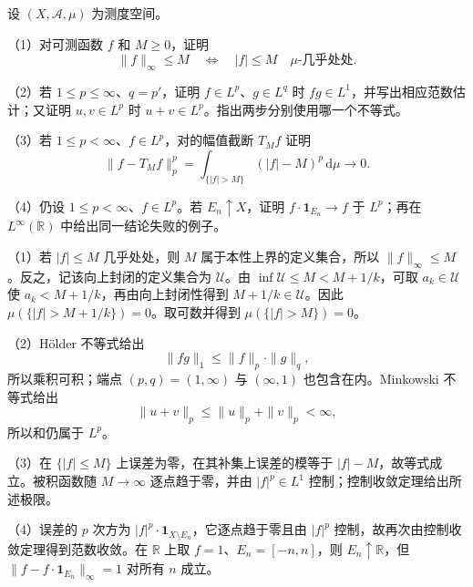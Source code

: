 \begin{exercise}[基础运算]\label{b1:ex:10-basic-norm-tools}
设 \((X,\mathcal A,\mu)\) 为测度空间。

\ProseParagraphBreak

（1）对可测函数 \(f\) 和 \(M\geq0\)，证明
\[
 \|f\|_\infty\leq M
 \quad\Longleftrightarrow\quad
 |f|\leq M\quad\mu\text{-几乎处处}.
\]

（2）若 \(1\leq p\leq\infty\)、\(q=p'\)，证明 \(f\in L^p\)、\(g\in L^q\) 时 \(fg\in L^1\)，并写出相应范数估计；又证明 \(u,v\in L^p\) 时 \(u+v\in L^p\)。指出两步分别使用哪一个不等式。

\ProseParagraphBreak

（3）若 \(1\leq p<\infty\)、\(f\in L^p\)，对的幅值截断 \(T_Mf\) 证明
\[
 \|f-T_Mf\|_p^p
 =\int_{\{|f|>M\}}(|f|-M)^p\,\mathrm d\mu
 \longrightarrow0.
\]

（4）仍设 \(1\leq p<\infty\)、\(f\in L^p\)。若 \(E_n\uparrow X\)，证明 \(f\cdot\mathbf1_{E_n}\to f\) 于 \(L^p\)；再在 \(L^\infty(\mathbb R)\) 中给出同一结论失败的例子。
\end{exercise}
\begin{solution}
（1）若 \(|f|\leq M\) 几乎处处，则 \(M\) 属于本性上界的定义集合，所以 \(\|f\|_\infty\leq M\)。反之，记该向上封闭的定义集合为 \(\mathcal U\)。由 \(\inf\mathcal U\leq M<M+1/k\)，可取 \(a_k\in\mathcal U\) 使 \(a_k<M+1/k\)，再由向上封闭性得到 \(M+1/k\in\mathcal U\)。因此
\(\mu(\{|f|>M+1/k\})=0\)。取可数并得到 \(\mu(\{|f|>M\})=0\)。

（2）Hölder 不等式给出
\[
 \|fg\|_1\leq\|f\|_p\cdot\|g\|_q,
\]
所以乘积可积；端点 \((p,q)=(1,\infty)\) 与 \((\infty,1)\) 也包含在内。Minkowski 不等式给出
\[
 \|u+v\|_p\leq\|u\|_p+\|v\|_p<\infty,
\]
所以和仍属于 \(L^p\)。

（3）在 \(\{|f|\leq M\}\) 上误差为零，在其补集上误差的模等于 \(|f|-M\)，故等式成立。被积函数随 \(M\to\infty\) 逐点趋于零，并由 \(|f|^p\in L^1\) 控制；控制收敛定理给出所述极限。

（4）误差的 \(p\) 次方为 \(|f|^p\cdot\mathbf1_{X\setminus E_n}\)，它逐点趋于零且由 \(|f|^p\) 控制，故再次由控制收敛定理得到范数收敛。在 \(\mathbb R\) 上取 \(f=1\)、\(E_n=[-n,n]\)，则 \(E_n\uparrow\mathbb R\)，但
\(\|f-f\cdot\mathbf1_{E_n}\|_\infty=1\) 对所有 \(n\) 成立。
\end{solution}

